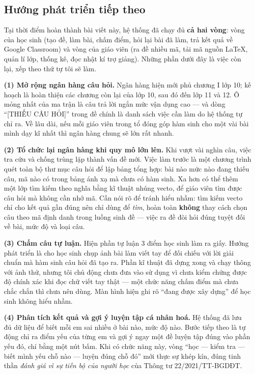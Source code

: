 \subsection{Hướng phát triển tiếp theo}

Tại thời điểm hoàn thành bài viết này, hệ thống đã chạy đủ \textbf{cả hai vòng}:
vòng của học sinh (tạo đề, làm bài, chấm điểm, hỏi lại bài đã làm, trả kết quả
về Google Classroom) và vòng của giáo viên (ra đề nhiều mã, tải mã nguồn
\LaTeX, quản lí lớp, thống kê, đọc nhật kí trợ giảng). Những phần dưới đây là
việc còn lại, xếp theo thứ tự tôi sẽ làm.

\textbf{(1) Mở rộng ngân hàng câu hỏi.} Ngân hàng hiện mới phủ chương I lớp 10;
kế hoạch là hoàn thiện các chương còn lại của lớp 10, sau đó đến lớp 11 và 12.
Ô mỏng nhất của ma trận là câu trả lời ngắn mức vận dụng cao --- và dòng
``[THIẾU CÂU HỎI]'' trong đề chính là danh sách việc cần làm do hệ thống tự chỉ
ra. Về lâu dài, nếu mỗi giáo viên trong tổ đóng góp hàm sinh cho một vài bài
mình dạy kĩ nhất thì ngân hàng chung sẽ lớn rất nhanh.

\textbf{(2) Tổ chức lại ngân hàng khi quy mô lớn lên.} Khi vượt vài nghìn câu,
việc tra cứu và chống trùng lặp thành vấn đề mới. Việc làm trước là một chương
trình quét toàn bộ thư mục câu hỏi để lập bảng tổng hợp: bài nào mức nào đang
thiếu câu, mã nào có trong bảng ánh xạ mà chưa có hàm sinh. Xa hơn có thể thêm
một lớp tìm kiếm theo nghĩa bằng kĩ thuật nhúng vecto, để giáo viên tìm được câu
hỏi mà không cần nhớ mã. Cần nói rõ để tránh hiểu nhầm: tìm kiếm vecto chỉ cho
kết quả gần đúng nên chỉ dùng để \textit{tìm}, hoàn toàn \textbf{không} thay cách
chọn câu theo mã định danh trong luồng sinh đề --- việc ra đề đòi hỏi đúng tuyệt
đối về bài, mức độ và loại câu.

\textbf{(3) Chấm câu tự luận.} Hiện phần tự luận 3 điểm học sinh làm ra giấy.
Hướng phát triển là cho học sinh chụp ảnh bài làm viết tay để đối chiếu với lời
giải chuẩn mà hàm sinh câu hỏi đã tạo ra. Phần kĩ thuật đã dựng xong và chạy
thông với ảnh thử, nhưng tôi chủ động chưa đưa vào sử dụng vì chưa kiểm chứng
được độ chính xác khi đọc chữ viết tay thật --- một chức năng chấm điểm mà chưa
chắc chắn thì chưa nên dùng. Màn hình hiện ghi rõ ``đang được xây dựng'' để học
sinh không hiểu nhầm.

\textbf{(4) Phân tích kết quả và gợi ý luyện tập cá nhân hoá.} Hệ thống đã lưu
đủ dữ liệu để biết mỗi em sai nhiều ở bài nào, mức độ nào. Bước tiếp theo là tự
động chỉ ra điểm yếu của từng em và gợi ý ngay một đề luyện tập đúng vào phần
yếu đó, chỉ bằng một nút bấm. Khi có chức năng này, vòng ``học --- kiểm tra ---
biết mình yếu chỗ nào --- luyện đúng chỗ đó'' mới thực sự khép kín, đúng tinh
thần \textit{đánh giá vì sự tiến bộ của người học} của Thông tư 22/2021/TT-BGDĐT.

